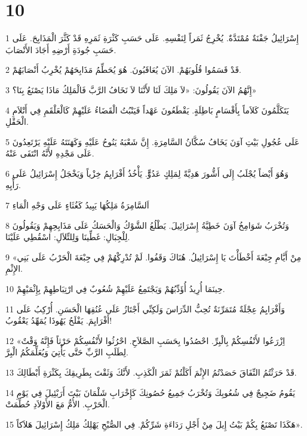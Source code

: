 \chapter{10}

\par 1 إِسْرَائِيلُ جَفْنَةٌ مُمْتَدَّةٌ. يُخْرِجُ ثَمَراً لِنَفْسِهِ. عَلَى حَسَبِ كَثْرَةِ ثَمَرِهِ قَدْ كَثَّرَ الْمَذَابِحَ. عَلَى حَسَبِ جُودَةِ أَرْضِهِ أَجَادَ الأَنْصَابَ.
\par 2 قَدْ قَسَمُوا قُلُوبَهُمْ. الآنَ يُعَاقَبُونَ. هُوَ يُحَطِّمُ مَذَابِحَهُمْ يُخْرِبُ أَنْصَابَهُمْ.
\par 3 إِنَّهُمُ الآنَ يَقُولُونَ: «لاَ مَلِكَ لَنَا لأَنَّنَا لاَ نَخَافُ الرَّبَّ فَالْمَلِكُ مَاذَا يَصْنَعُ بِنَا؟»
\par 4 يَتَكَلَّمُونَ كَلاَماً بِأَقْسَامٍ بَاطِلَةٍ. يَقْطَعُونَ عَهْداً فَيَنْبُتُ الْقَضَاءُ عَلَيْهِمْ كَالْعَلْقَمِ فِي أَتْلاَمِ الْحَقْلِ.
\par 5 عَلَى عُجُولِ بَيْتِ آوَنَ يَخَافُ سُكَّانُ السَّامِرَةِ. إِنَّ شَعْبَهُ يَنُوحُ عَلَيْهِ وَكَهَنَتَهُ عَلَيْهِ يَرْتَعِدُونَ عَلَى مَجْدِهِ لأَنَّهُ انْتَفَى عَنْهُ.
\par 6 وَهُوَ أَيْضاً يُجْلَبُ إِلَى أَشُّورَ هَدِيَّةً لِمَلِكٍ عَدُوٍّّ. يَأْخُذُ أَفْرَايِمُ خِزْياً وَيَخْجَلُ إِسْرَائِيلُ عَلَى رَأْيِهِ.
\par 7 اَلسَّامِرَةُ مَلِكُهَا يَبِيدُ كَغُثَاءٍ عَلَى وَجْهِ الْمَاءِ
\par 8 وَتُخْرَبُ شَوَامِخُ آوَنَ خَطِيَّةُ إِسْرَائِيلَ. يَطْلُعُ الشَّوْكُ وَالْحَسَكُ عَلَى مَذَابِحِهِمْ وَيَقُولُونَ لِلْجِبَالِ: غَطِّينَا وَلِلتِّلاَلِ: اسْقُطِي عَلَيْنَا.
\par 9 «مِنْ أَيَّامِ جِبْعَةَ أَخْطَأْتَ يَا إِسْرَائِيلُ. هُنَاكَ وَقَفُوا. لَمْ تُدْرِكْهُمْ فِي جِبْعَةَ الْحَرْبُ عَلَى بَنِي الإِثْمِ.
\par 10 حِينَمَا أُرِيدُ أُؤَدِّبُهُمْ وَيَجْتَمِعُ عَلَيْهِمْ شُعُوبٌ فِي ارْتِبَاطِهِمْ بِإِثْمَيْهِمْ.
\par 11 وَأَفْرَايِمُ عِجْلَةٌ مُتَمَرِّنَةٌ تُحِبُّ الدِّرَاسَ وَلَكِنِّي أَجْتَازُ عَلَى عُنُقِهَا الْحَسَنِ. أُرْكِبُ عَلَى أَفْرَايِمَ. يَفْلَحُ يَهُوذَا يُمَهِّدُ يَعْقُوبُ!
\par 12 «اِزْرَعُوا لأَنْفُسِكُمْ بِالْبِرِّ. احْصُدُوا بِحَسَبِ الصَّلاَحِ. احْرُثُوا لأَنْفُسِكُمْ حَرْثاً فَإِنَّهُ وَقْتٌ لِطَلَبِ الرَّبِّ حَتَّى يَأْتِيَ وَيُعَلِّمَكُمُ الْبِرَّ.
\par 13 قَدْ حَرَثْتُمُ النِّفَاقَ حَصَدْتُمُ الإِثْمَ أَكَلْتُمْ ثَمَرَ الْكَذِبِ. لأَنَّكَ وَثَقْتَ بِطَرِيقِكَ بِكَثْرَةِ أَبْطَالِكَ.
\par 14 يَقُومُ ضَجِيجٌ فِي شُعُوبِكَ وَتُخْرَبُ جَمِيعُ حُصُونِكَ كَإِخْرَابِ شَلْمَانَ بَيْتَ أَرَبْئِيلَ فِي يَوْمِ الْحَرْبِ. الأُمُّ مَعَ الأَوْلاَدِ حُطِّمَتْ.
\par 15 هَكَذَا تَصْنَعُ بِكُمْ بَيْتُ إِيلَ مِنْ أَجْلِ رَدَاءَةِ شَرِّكُمْ. فِي الصُّبْحِ يَهْلِكُ مَلِكُ إِسْرَائِيلَ هَلاَكاً».

